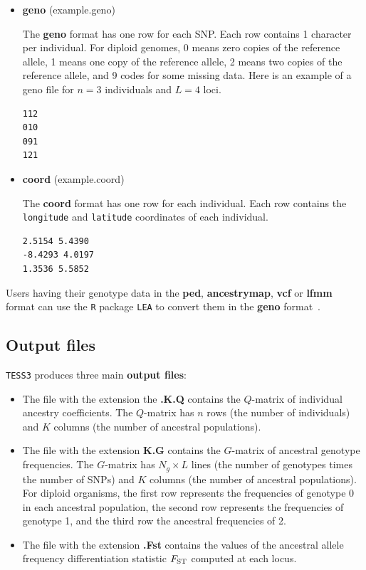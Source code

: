 \documentclass[12pt,a4paper]{article}
\begin{document}
\begin{itemize}
\item {\bf geno} (example.geno)

The {\bf geno} format has one row for each SNP. Each row contains 1 character 
per individual. For diploid genomes,  0 means zero copies of the reference 
allele, 1 means one copy of the reference allele, 2 means two copies of the 
reference allele, and 9 codes for some missing data. Here is an example of a 
geno file for $n=3$ individuals and $L=4$ loci.
\\
\begin{center}
\footnotesize
\begin{Verbatim}[frame=single]
112
010
091
121
\end{Verbatim}
\end{center}


\item {\bf coord} (example.coord)

The {\bf coord} format has one row for each individual. Each row contains the 
\verb|longitude| and \verb|latitude| coordinates of each individual.
\\
\begin{center}
\footnotesize
\begin{Verbatim}[frame=single]
2.5154 5.4390
-8.4293 4.0197
1.3536 5.5852
\end{Verbatim}
\end{center}

\end{itemize}

\noindent Users having their genotype data in the {\bf ped}, {\bf ancestrymap}, 
{\bf vcf} or {\bf lfmm} format  can use the {\tt R} package {\tt LEA} to convert 
them in the {\bf geno} format~\cite{frichot2015lea}. 

\subsection{Output files}

{\tt TESS3} produces three main {\bf output files}:

\begin{itemize}
\item The file with the extension the {\bf .K.Q} contains the $Q$-matrix of 
individual ancestry coefficients.
The $Q$-matrix has $n$ rows (the number of individuals) and $K$ columns (the 
number of ancestral populations).
\item The file with the extension {\bf K.G} contains the $G$-matrix of ancestral 
genotype frequencies.
The $G$-matrix has $N_g\times L$ lines (the number of genotypes times the number 
of SNPs) and $K$ columns (the number of ancestral populations). For diploid 
organisms, the first row represents the frequencies of genotype 0 in each 
ancestral population, the second row represents the frequencies of genotype 1, 
and the third row the ancestral frequencies of 2.
\item The file with the extension {\bf .Fst} contains the values of the 
ancestral allele frequency differentiation statistic $F_{\rm ST}$ computed at 
each locus.  
\end{itemize}
\end{document}
